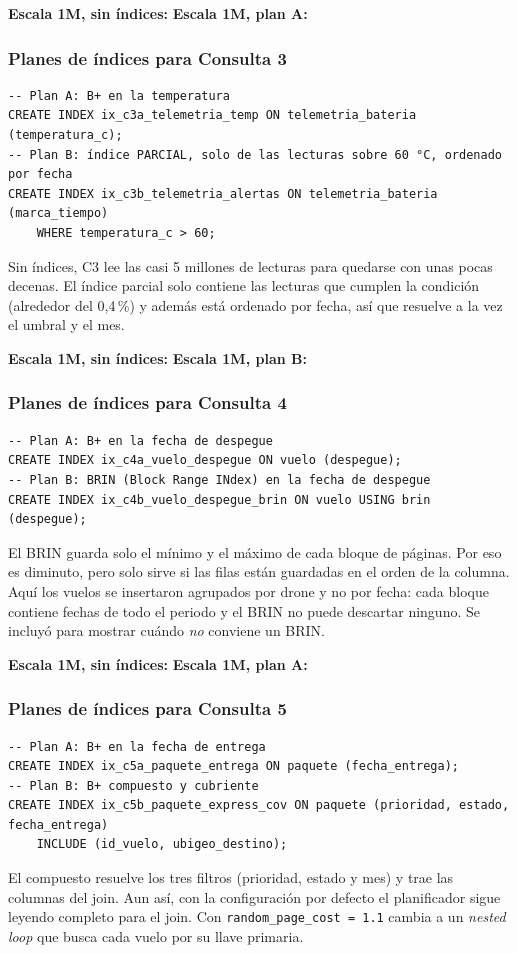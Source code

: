 \noindent\textbf{Escala 1M, sin índices:}
\noindent\textbf{Escala 1M, plan A:}

\subsubsection{Planes de índices para Consulta 3}
\begin{lstlisting}[style=sql]
-- Plan A: B+ en la temperatura
CREATE INDEX ix_c3a_telemetria_temp ON telemetria_bateria (temperatura_c);
-- Plan B: índice PARCIAL, solo de las lecturas sobre 60 °C, ordenado por fecha
CREATE INDEX ix_c3b_telemetria_alertas ON telemetria_bateria (marca_tiempo)
    WHERE temperatura_c > 60;
\end{lstlisting}
Sin índices, C3 lee las casi 5 millones de lecturas para quedarse con unas pocas decenas. El índice parcial solo contiene las lecturas que cumplen la condición (alrededor del 0,4\,\%) y además está ordenado por fecha, así que resuelve a la vez el umbral y el mes.

\noindent\textbf{Escala 1M, sin índices:}
\noindent\textbf{Escala 1M, plan B:}

\subsubsection{Planes de índices para Consulta 4}
\begin{lstlisting}[style=sql]
-- Plan A: B+ en la fecha de despegue
CREATE INDEX ix_c4a_vuelo_despegue ON vuelo (despegue);
-- Plan B: BRIN (Block Range INdex) en la fecha de despegue
CREATE INDEX ix_c4b_vuelo_despegue_brin ON vuelo USING brin (despegue);
\end{lstlisting}
El BRIN guarda solo el mínimo y el máximo de cada bloque de páginas. Por eso es diminuto, pero solo sirve si las filas están guardadas en el orden de la columna. Aquí los vuelos se insertaron agrupados por drone y no por fecha: cada bloque contiene fechas de todo el periodo y el BRIN no puede descartar ninguno. Se incluyó para mostrar cuándo \emph{no} conviene un BRIN.

\noindent\textbf{Escala 1M, sin índices:}
\noindent\textbf{Escala 1M, plan A:}

\subsubsection{Planes de índices para Consulta 5}
\begin{lstlisting}[style=sql]
-- Plan A: B+ en la fecha de entrega
CREATE INDEX ix_c5a_paquete_entrega ON paquete (fecha_entrega);
-- Plan B: B+ compuesto y cubriente
CREATE INDEX ix_c5b_paquete_express_cov ON paquete (prioridad, estado, fecha_entrega)
    INCLUDE (id_vuelo, ubigeo_destino);
\end{lstlisting}
El compuesto resuelve los tres filtros (prioridad, estado y mes) y trae las columnas del join. Aun así, con la configuración por defecto el planificador sigue leyendo  completo para el join. Con \texttt{random\_page\_cost = 1.1} cambia a un \emph{nested loop} que busca cada vuelo por su llave primaria.

